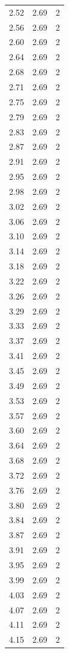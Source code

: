 \begin{longtable}{lrr}
  2.52 & 2.69 & 2 \\
  2.56 & 2.69 & 2 \\
  2.60 & 2.69 & 2 \\
  2.64 & 2.69 & 2 \\
  2.68 & 2.69 & 2 \\
  2.71 & 2.69 & 2 \\
  2.75 & 2.69 & 2 \\
  2.79 & 2.69 & 2 \\
  2.83 & 2.69 & 2 \\
  2.87 & 2.69 & 2 \\
  2.91 & 2.69 & 2 \\
  2.95 & 2.69 & 2 \\
  2.98 & 2.69 & 2 \\
  3.02 & 2.69 & 2 \\
  3.06 & 2.69 & 2 \\
  3.10 & 2.69 & 2 \\
  3.14 & 2.69 & 2 \\
  3.18 & 2.69 & 2 \\
  3.22 & 2.69 & 2 \\
  3.26 & 2.69 & 2 \\
  3.29 & 2.69 & 2 \\
  3.33 & 2.69 & 2 \\
  3.37 & 2.69 & 2 \\
  3.41 & 2.69 & 2 \\
  3.45 & 2.69 & 2 \\
  3.49 & 2.69 & 2 \\
  3.53 & 2.69 & 2 \\
  3.57 & 2.69 & 2 \\
  3.60 & 2.69 & 2 \\
  3.64 & 2.69 & 2 \\
  3.68 & 2.69 & 2 \\
  3.72 & 2.69 & 2 \\
  3.76 & 2.69 & 2 \\
  3.80 & 2.69 & 2 \\
  3.84 & 2.69 & 2 \\
  3.87 & 2.69 & 2 \\
  3.91 & 2.69 & 2 \\
  3.95 & 2.69 & 2 \\
  3.99 & 2.69 & 2 \\
  4.03 & 2.69 & 2 \\
  4.07 & 2.69 & 2 \\
  4.11 & 2.69 & 2 \\
  4.15 & 2.69 & 2 \\

\end{longtable}
